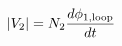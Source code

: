 \documentclass[preview]{standalone}
\begin{document}
\begin{align*}
|V_2| = N_2 {d \phi_{1,\text{loop}} \over d t}
\end{align*}
\end{document}
